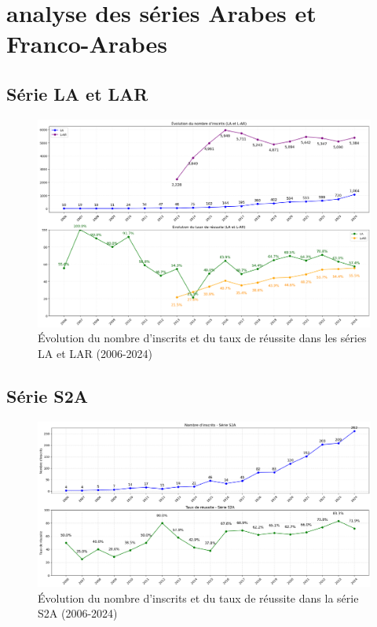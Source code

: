 \newpage
\section{analyse des séries Arabes et Franco-Arabes}

\subsection{Série LA et LAR}

\begin{figure}[h]
\centering
\caption{Évolution du nombre d'inscrits et du taux de réussite dans les séries LA et LAR (2006-2024)}
\includegraphics[width=1\textwidth]{figure/bac_LA_LAR.png}
\end{figure}

\newpage
\subsection{Série S2A}

\begin{figure}[h]
\centering
\caption{Évolution du nombre d'inscrits et du taux de réussite dans la série S2A (2006-2024)}
\includegraphics[width=1\textwidth]{figure/bac_S2A.png}
\end{figure}

